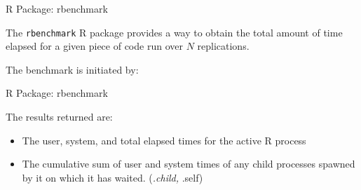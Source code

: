 \begin{frame}[fragile]{R Package: rbenchmark}

The \texttt{rbenchmark} R package provides a way to obtain the total
amount of time elapsed for a given piece of code run over \(N\)
replications.

The benchmark is initiated by:

\begin{Shaded}
\begin{Highlighting}[]
\NormalTok{(}\NormalTok{)}

\NormalTok{(} \NormalTok{(),}
           \NormalTok{())}
\end{Highlighting}
\end{Shaded}

\end{frame}

\begin{frame}{R Package: rbenchmark}

The results returned are:

\begin{itemize}
\tightlist
\item
  The user, system, and total elapsed times for the active R process
\item
  The cumulative sum of user and system times of any child processes
  spawned by it on which it has waited. (\emph{.child, }.self)
\end{itemize}

\end{frame}

